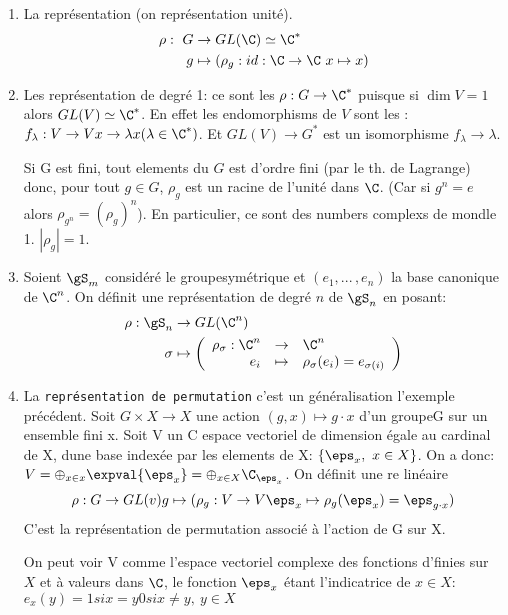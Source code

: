 \begin{examplebox}
	\begin{enumerate}
	\leavevmode
		\item La représentation  (on représentation unité).
		\begin{align*}
			\rho:\ G &\rightarrow GL(\C)\simeq\C^\ast\\
			g &\mapsto (\rho_g: id:\C\rightarrow \C\ x\mapsto x)
		\end{align*}
		\item Les représentation de degré 1: ce sont les  $\rho:G\rightarrow \C^\ast$ puisque si $\dim V= 1$ alors $GL(V)\simeq\C^\ast$.
		En effet les endomorphisms de $V$ sont les : $f_\lambda: V\rightarrow V x\rightarrow \lambda x(\lambda\in \C^\ast)$. Et $GL(V)\rightarrow  G^\ast$ est un isomorphisme $f_\lambda\rightarrow \lambda$.
		
		Si G est fini, tout elements du $G$ est d'ordre fini (par le th. de Lagrange) donc, pour tout $g \in G$, $\rho_g$ est un racine de l'unité dans $\C$.
		(Car si $g^n=e$ alors $\rho_{g^n}=(\rho_g)^n$). En particulier, ce sont des numbers complexs de mondle 1. $|\rho_g|=1$.
		\item Soient $\gS_m$ considéré le groupesymétrique et $(e_1,...\,, e_n)$ la base canonique de $\C^n$. On définit une représentation de degré $n$ de $\gS_n$ en posant:
		\begin{align*}
			\rho:\gS_n &\rightarrow GL(\C^n) \\
			\sigma &\mapsto \left(
				\begin{array}{rcl} \rho_\sigma: \C^n &\rightarrow&  \C^n \\ e_i &\mapsto& \rho_\sigma(e_i)=e_{\sigma(i)} \end{array}
			\right)
		\end{align*}
		\item La \texttt{représentation de permutation} c'est un généralisation l'exemple précédent. Soit $G\times X\rightarrow X$ une action $(g,x)\mapsto g\cdot x$ d'un groupeG sur un ensemble fini x. Soit V un C espace vectoriel de dimension égale au cardinal de X, dune base indexée par les elements de X: $\{\eps_x,\ x\in X\}$. On a donc: $V=\oplus_{x\in x}\expval{\eps_x}=\oplus_{x\in X}\C_{\eps_x}$. On définit une re linéaire
		$$ \rho: G\rightarrow  GL(v)\\g\mapsto(\rho_g:V\rightarrow  V\\\eps_x\mapsto \rho_g(\eps_x)=\eps_{g\cdot x})$$
		C'est la représentation de permutation associé à l'action de G sur X.
		\begin{remark}
			On peut voir V comme l'espace vectoriel complexe des fonctions d'finies sur $X$ et à valeurs dans $\C$, le fonction $\eps_x$ étant l'indicatrice de $x\in X$: $e_x(y)=1 si x=y 0 si x\neq y,\ y\in X$
		\end{remark}
		

\end{enumerate}
\end{examplebox}
